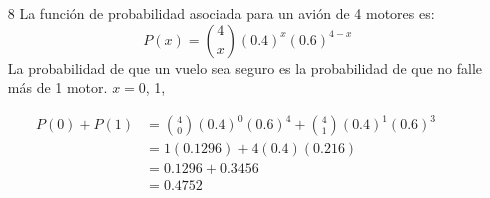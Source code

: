 \documentclass[10pt,letterpaper]{article}
\author{Germán Avendaño Ramírez}
\begin{document}
\begin{itemize}
\item[8] La función de probabilidad asociada para un avi\'{o}n de 4 motores es:
\[P(x)=\displaystyle{4 \choose x}(0.4)^{x}(0.6)^{4-x}\]
La probabilidad de que un vuelo sea seguro es la probabilidad de que no falle más de 1 motor.
$x=0$, 1, 
\end{itemize}
\begin{align*}
P(0)+P(1)&=\displaystyle{4 \choose 0}(0.4)^{0}(0.6)^{4}+\displaystyle{4 \choose 1}(0.4)^{1}(0.6)^{3}\\
&=1(0.1296)+4(0.4)(0.216)\\
&=0.1296+0.3456\\
&=0.4752
\end{align*}
\end{document}
